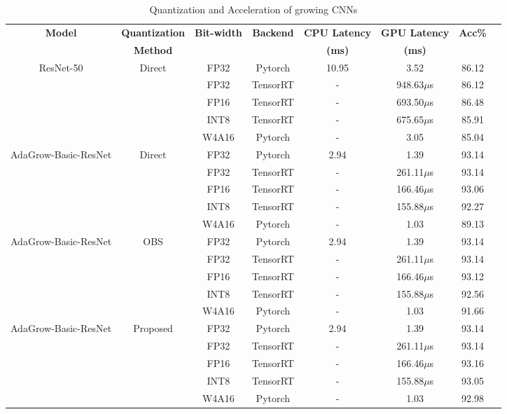 \documentclass[preprint,12pt]{elsarticle}
\begin{document}
\begin{table}[ht]
\centering
\tiny
\renewcommand{\arraystretch}{1.3}
\begin{adjustbox}{center}
\begin{tabular}{cccccccc}
\hline
\textbf{Model} & \textbf{Quantization} & \textbf{Bit-width} & \textbf{Backend} & \textbf{CPU Latency} & \textbf{GPU Latency} & \textbf{Acc\%} \\
 & \textbf{Method} & & & \textbf{(ms)} & \textbf{(ms)} & \\
\hline
ResNet-50 & Direct & FP32 & Pytorch & 10.95 & 3.52 & 86.12 \\
 & & FP32 & TensorRT & - & 948.63$\mu$s & 86.12 \\
 & & FP16 & TensorRT & - & 693.50$\mu$s & 86.48 \\
 & & INT8 & TensorRT & - & 675.65$\mu$s & 85.91 \\
 & & W4A16 & Pytorch & - & 3.05 & 85.04 \\
\hline
AdaGrow-Basic-ResNet & Direct & FP32 & Pytorch & 2.94 & 1.39 & 93.14 \\
 & & FP32 & TensorRT & - & 261.11$\mu$s & 93.14 \\
 & & FP16 & TensorRT & - & 166.46$\mu$s & 93.06 \\
 & & INT8 & TensorRT & - & 155.88$\mu$s & 92.27 \\
 & & W4A16 & Pytorch & - & 1.03 & 89.13 \\
\hline
AdaGrow-Basic-ResNet & OBS & FP32 & Pytorch & 2.94 & 1.39 & 93.14 \\
 & & FP32 & TensorRT & - & 261.11$\mu$s & 93.14 \\
 & & FP16 & TensorRT & - & 166.46$\mu$s & 93.12 \\
 & & INT8 & TensorRT & - & 155.88$\mu$s & 92.56 \\
 & & W4A16 & Pytorch & - & 1.03 & 91.66 \\
\hline
AdaGrow-Basic-ResNet & Proposed & FP32 & Pytorch & 2.94 & 1.39 & 93.14 \\
 & & FP32 & TensorRT & - & 261.11$\mu$s & 93.14 \\
 & & FP16 & TensorRT & - & 166.46$\mu$s & 93.16 \\
 & & INT8 & TensorRT & - & 155.88$\mu$s & 93.05 \\
 & & W4A16 & Pytorch & - & 1.03 & 92.98 \\
\hline
\end{tabular}
\end{adjustbox}
\caption{Quantization and Acceleration of growing CNNs}
\label{table:quantization}
\end{table}
\end{document}
